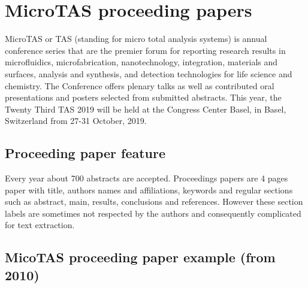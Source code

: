 \section{MicroTAS proceeding papers}
\label{Appendice_MicroTASpaper}

MicroTAS or \textmu TAS (standing for micro total analysis systems) is annual conference series that are the premier forum for reporting research results in microfluidics, microfabrication, nanotechnology, integration, materials and surfaces, analysis and synthesis, and detection technologies for life science and chemistry. The Conference offers plenary talks as well as contributed oral presentations and posters selected from submitted abstracts. This year, the Twenty Third \textmu TAS 2019 will be held at the Congress Center Basel, in Basel, Switzerland from 27-31 October, 2019.
\newline

\subsection{Proceeding paper feature}
Every year about 700 abstracts are accepted. Proceedings papers are 4 pages paper with title, authors names and affiliations, keywords and regular sections such as abstract, main, results, conclusions and references. However these section labels are sometimes not respected by the authors and consequently complicated for text extraction. 

\subsection{MicoTAS proceeding paper example (from 2010)}
